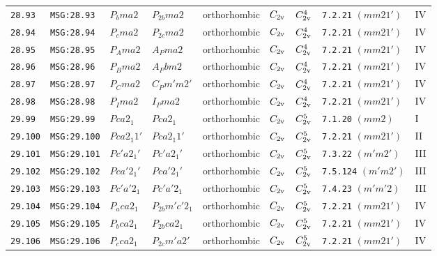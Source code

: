 \documentclass[fleqn,10pt]{jsarticle}
\begin{document}
\begin{center}
\begin{longtable}{lllllllll}
\texttt{28.93} & \texttt{MSG:28.93} & $P_{b}ma2$ & $P_{2b}ma2$ & orthorhombic & $C_{\rm 2v}$ & $C_{\rm 2v}^{4}$ & \texttt{7.2.21} $(mm21')$ & IV \\
\texttt{28.94} & \texttt{MSG:28.94} & $P_{c}ma2$ & $P_{2c}ma2$ & orthorhombic & $C_{\rm 2v}$ & $C_{\rm 2v}^{4}$ & \texttt{7.2.21} $(mm21')$ & IV \\
\texttt{28.95} & \texttt{MSG:28.95} & $P_{A}ma2$ & $A_{P}ma2$ & orthorhombic & $C_{\rm 2v}$ & $C_{\rm 2v}^{4}$ & \texttt{7.2.21} $(mm21')$ & IV \\
\texttt{28.96} & \texttt{MSG:28.96} & $P_{B}ma2$ & $A_{P}bm2$ & orthorhombic & $C_{\rm 2v}$ & $C_{\rm 2v}^{4}$ & \texttt{7.2.21} $(mm21')$ & IV \\
\texttt{28.97} & \texttt{MSG:28.97} & $P_{C}ma2$ & $C_{P}m'm2'$ & orthorhombic & $C_{\rm 2v}$ & $C_{\rm 2v}^{4}$ & \texttt{7.2.21} $(mm21')$ & IV \\
\texttt{28.98} & \texttt{MSG:28.98} & $P_{I}ma2$ & $I_{P}ma2$ & orthorhombic & $C_{\rm 2v}$ & $C_{\rm 2v}^{4}$ & \texttt{7.2.21} $(mm21')$ & IV \\ \hline
\texttt{29.99} & \texttt{MSG:29.99} & $Pca2_{1}$ & $Pca2_{1}$ & orthorhombic & $C_{\rm 2v}$ & $C_{\rm 2v}^{5}$ & \texttt{7.1.20} $(mm2)$ & I \\
\texttt{29.100} & \texttt{MSG:29.100} & $Pca2_{1}1'$ & $Pca2_{1}1'$ & orthorhombic & $C_{\rm 2v}$ & $C_{\rm 2v}^{5}$ & \texttt{7.2.21} $(mm21')$ & II \\
\texttt{29.101} & \texttt{MSG:29.101} & $Pc'a2_{1}'$ & $Pc'a2_{1}'$ & orthorhombic & $C_{\rm 2v}$ & $C_{\rm 2v}^{5}$ & \texttt{7.3.22} $(m'm2')$ & III \\
\texttt{29.102} & \texttt{MSG:29.102} & $Pca'2_{1}'$ & $Pca'2_{1}'$ & orthorhombic & $C_{\rm 2v}$ & $C_{\rm 2v}^{5}$ & \texttt{7.5.124} $(m'm2')$ & III \\
\texttt{29.103} & \texttt{MSG:29.103} & $Pc'a'2_{1}$ & $Pc'a'2_{1}$ & orthorhombic & $C_{\rm 2v}$ & $C_{\rm 2v}^{5}$ & \texttt{7.4.23} $(m'm'2)$ & III \\
\texttt{29.104} & \texttt{MSG:29.104} & $P_{a}ca2_{1}$ & $P_{2b}m'c'2_{1}$ & orthorhombic & $C_{\rm 2v}$ & $C_{\rm 2v}^{5}$ & \texttt{7.2.21} $(mm21')$ & IV \\
\texttt{29.105} & \texttt{MSG:29.105} & $P_{b}ca2_{1}$ & $P_{2b}ca2_{1}$ & orthorhombic & $C_{\rm 2v}$ & $C_{\rm 2v}^{5}$ & \texttt{7.2.21} $(mm21')$ & IV \\
\texttt{29.106} & \texttt{MSG:29.106} & $P_{c}ca2_{1}$ & $P_{2c}m'a2'$ & orthorhombic & $C_{\rm 2v}$ & $C_{\rm 2v}^{5}$ & \texttt{7.2.21} $(mm21')$ & IV \\

\end{longtable}
\end{center}
\end{document}
